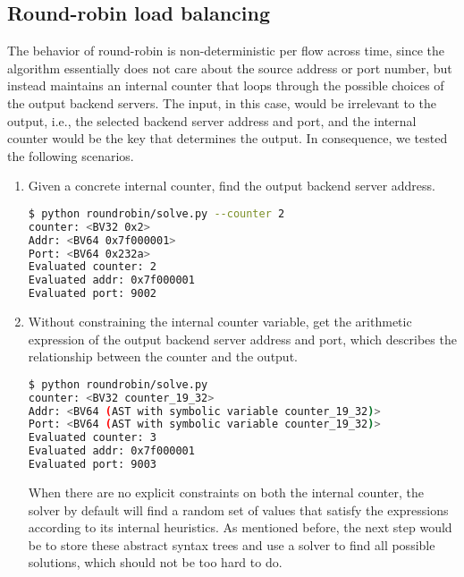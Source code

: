\subsection{Round-robin load balancing}

The behavior of round-robin is non-deterministic per flow across time, since the
algorithm essentially does not care about the source address or port number, but
instead maintains an internal counter that loops through the possible choices of
the output backend servers. The input, in this case, would be irrelevant to the
output, i.e., the selected backend server address and port, and the internal
counter would be the key that determines the output. In consequence, we tested
the following scenarios.

\begin{enumerate}
    \item Given a concrete internal counter, find the output backend server
        address.

\begin{lstlisting}[language=bash]
$ python roundrobin/solve.py --counter 2
counter: <BV32 0x2>
Addr: <BV64 0x7f000001>
Port: <BV64 0x232a>
Evaluated counter: 2
Evaluated addr: 0x7f000001
Evaluated port: 9002
\end{lstlisting}

    \item Without constraining the internal counter variable, get the
        arithmetic expression of the output backend server address and port,
        which describes the relationship between the counter and the output.

\begin{lstlisting}[language=bash]
$ python roundrobin/solve.py
counter: <BV32 counter_19_32>
Addr: <BV64 (AST with symbolic variable counter_19_32)>
Port: <BV64 (AST with symbolic variable counter_19_32)>
Evaluated counter: 3
Evaluated addr: 0x7f000001
Evaluated port: 9003
\end{lstlisting}

        When there are no explicit constraints on both the internal counter,
        the solver by default will find a random set of values that satisfy the
        expressions according to its internal heuristics. As mentioned before,
        the next step would be to store these abstract syntax trees and use a
        solver to find all possible solutions, which should not be too hard to
        do.
\end{enumerate}

